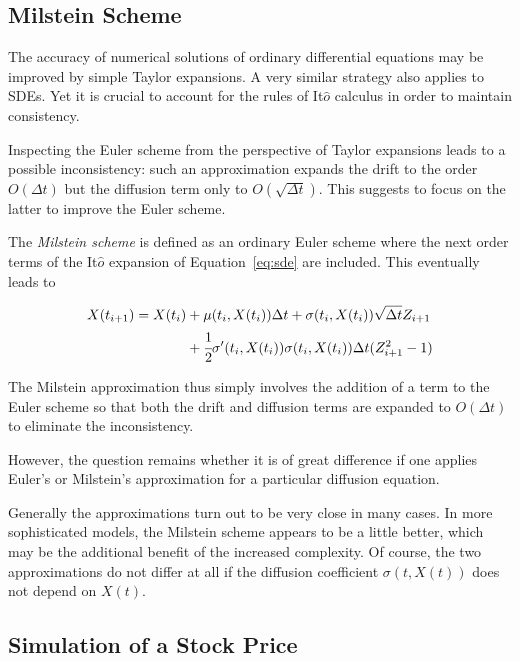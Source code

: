 \begin{attention}
\subsection{Milstein Scheme}
The accuracy of numerical solutions of ordinary differential equations may be improved by simple Taylor expansions. A very similar strategy also applies to SDEs. Yet it is crucial to account for the rules of It$\hat{o}$ calculus in order to maintain consistency.

Inspecting the Euler scheme from the perspective of Taylor expansions leads to a possible inconsistency: such an approximation expands the drift to the order $O(\Delta t)$ but the diffusion term only to $O(\sqrt{\Delta t})$. This suggests to focus on the latter to improve the Euler scheme.

The \textit{Milstein scheme} is defined as an ordinary Euler scheme where the next order terms of the It$\hat{o}$ expansion of Equation~\ref{eq:sde} are included. This eventually leads to

\begin{equation}
\begin{aligned}
X(t_{i+1})= X(t_i) &+ \mu(t_i, X(t_i))\Delta t+\sigma(t_i,X(t_i))\sqrt{\Delta t}Z_{i+1} \\
&+\cfrac{1}{2}\sigma'(t_i ,X(t_i))\sigma (t_i ,X(t_i))\Delta t(Z^2_{i+1} -1)
\end{aligned}
\end{equation}

The Milstein approximation thus simply involves the addition of a term to the Euler scheme so that both the drift and diffusion terms are expanded to $O(\Delta t)$ to eliminate the inconsistency. 

However, the question remains whether it is of great difference if one applies Euler’s or Milstein’s approximation for a particular diffusion equation. 

Generally the approximations turn out to be very close in many cases. In more sophisticated models, the Milstein scheme appears to be a little better, which may be the additional benefit of the increased complexity. Of course, the two approximations do not differ at all if the diffusion coefficient $\sigma (t,X(t))$ does not depend on $X(t)$.
\end{attention}

\subsection{Simulation of a Stock Price}


